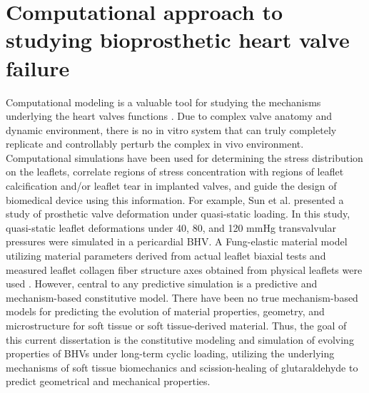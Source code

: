 \section{Computational approach to studying bioprosthetic heart valve failure}

    Computational modeling is a valuable tool for studying the mechanisms underlying the heart valves functions \cite{soares_biomechanical_2016}. Due to complex valve anatomy and dynamic environment, there is no in vitro system that can truly completely replicate and controllably perturb the complex in vivo environment. Computational simulations have been used for determining the stress distribution on the leaflets, correlate regions of stress concentration with regions of leaflet calcification and/or leaflet tear in implanted valves, and guide the design of biomedical device using this information. For example, Sun et al. \cite{sun_simulated_2005} presented a study of prosthetic valve deformation under quasi-static loading. In this study, quasi-static leaflet deformations under 40, 80, and 120 mmHg transvalvular pressures were simulated in a pericardial BHV. A Fung-elastic material model utilizing material parameters derived from actual leaflet biaxial tests and measured leaflet collagen fiber structure axes obtained from physical leaflets were used \cite{sun_finite_2005,sun_effects_2005}. However, central to any predictive simulation is a predictive and mechanism-based constitutive model. There have been no true mechanism-based models for predicting the evolution of material properties, geometry, and microstructure for soft tissue or soft tissue-derived material. Thus, the goal of this current dissertation is the constitutive modeling and simulation of evolving properties of BHVs under long-term cyclic loading, utilizing the underlying mechanisms of soft tissue biomechanics and scission-healing of glutaraldehyde to predict geometrical and mechanical properties. 


